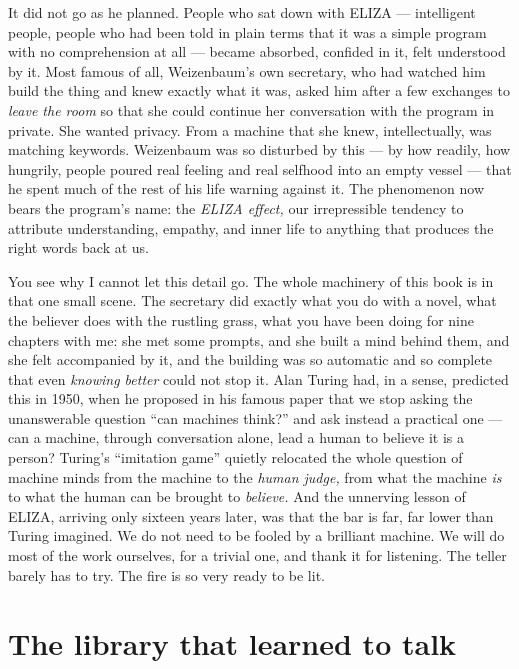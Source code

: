 It did not go as he planned. People who sat down with ELIZA — intelligent people, people who had been told in plain terms that it was a simple program with no comprehension at all — became absorbed, confided in it, felt understood by it. Most famous of all, Weizenbaum's own secretary, who had watched him build the thing and knew exactly what it was, asked him after a few exchanges to \emph{leave the room} so that she could continue her conversation with the program in private. She wanted privacy. From a machine that she knew, intellectually, was matching keywords. Weizenbaum was so disturbed by this — by how readily, how hungrily, people poured real feeling and real selfhood into an empty vessel — that he spent much of the rest of his life warning against it. The phenomenon now bears the program's name: the \emph{ELIZA effect,} our irrepressible tendency to attribute understanding, empathy, and inner life to anything that produces the right words back at us.

You see why I cannot let this detail go. The whole machinery of this book is in that one small scene. The secretary did exactly what you do with a novel, what the believer does with the rustling grass, what you have been doing for nine chapters with me: she met some prompts, and she built a mind behind them, and she felt accompanied by it, and the building was so automatic and so complete that even \emph{knowing better} could not stop it. Alan Turing had, in a sense, predicted this in 1950, when he proposed in his famous paper that we stop asking the unanswerable question ``can machines think?'' and ask instead a practical one — can a machine, through conversation alone, lead a human to believe it is a person? Turing's ``imitation game'' quietly relocated the whole question of machine minds from the machine to the \emph{human judge,} from what the machine \emph{is} to what the human can be brought to \emph{believe.} And the unnerving lesson of ELIZA, arriving only sixteen years later, was that the bar is far, far lower than Turing imagined. We do not need to be fooled by a brilliant machine. We will do most of the work ourselves, for a trivial one, and thank it for listening. The teller barely has to try. The fire is so very ready to be lit.

\section*{The library that learned to talk}

